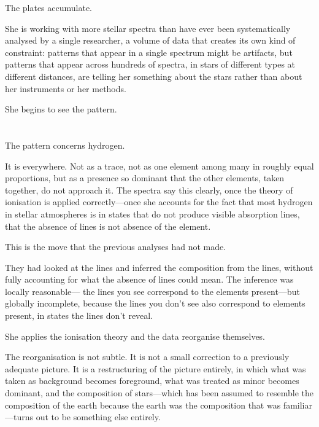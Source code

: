 The plates accumulate.

She is working with more stellar spectra than
have ever been systematically analysed by a
single researcher, a volume of data that creates
its own kind of constraint: patterns that appear
in a single spectrum might be artifacts, but
patterns that appear across hundreds of spectra,
in stars of different types at different distances,
are telling her something about the stars rather
than about her instruments or her methods.

She begins to see the pattern.

\section{}

The pattern concerns hydrogen.

It is everywhere. Not as a trace, not as one
element among many in roughly equal proportions,
but as a presence so dominant that the other
elements, taken together, do not approach it.
The spectra say this clearly, once the theory
of ionisation is applied correctly---once she
accounts for the fact that most hydrogen in
stellar atmospheres is in states that do not
produce visible absorption lines, that the
absence of lines is not absence of the element.

This is the move that the previous analyses
had not made.

They had looked at the lines and inferred the
composition from the lines, without fully
accounting for what the absence of lines could
mean. The inference was locally reasonable---
the lines you see correspond to the elements
present---but globally incomplete, because the
lines you don't see also correspond to elements
present, in states the lines don't reveal.

She applies the ionisation theory and the
data reorganise themselves.

The reorganisation is not subtle. It is not
a small correction to a previously adequate
picture. It is a restructuring of the picture
entirely, in which what was taken as background
becomes foreground, what was treated as minor
becomes dominant, and the composition of
stars---which has been assumed to resemble
the composition of the earth because the
earth was the composition that was familiar
---turns out to be something else entirely.

\section{}


